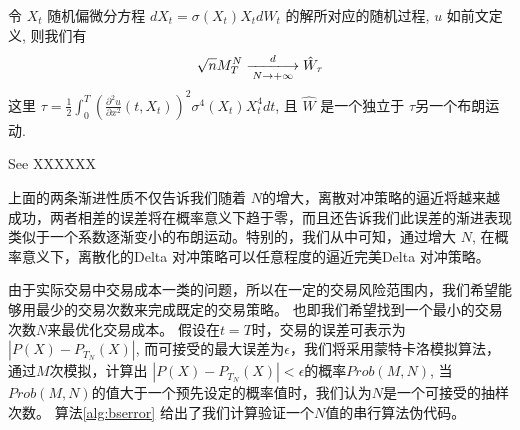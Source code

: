 令 $X_t$ 随机偏微分方程 $dX_t=\sigma(X_t)X_tdW_t$ 的解所对应的随机过程, $u$ 如前文定义, 则我们有 
\begin{equation}
\sqrt{n}M_T^N\xlongrightarrow[N\rightarrow +\infty]{d} \hat{W}_\tau
\end{equation}
这里 $\tau=\frac{1}{2}\int_0^T(\frac{\partial^2 u}{\partial x^2}(t,X_t))^2\sigma^4(X_t)X_t^4dt$, 且 $\hat{W}$ 是一个独立于 $\tau$另一个布朗运动.

See XXXXXX

上面的两条渐进性质不仅告诉我们随着 $N$的增大，离散对冲策略的逼近将越来越成功，两者相差的误差将在概率意义下趋于零，而且还告诉我们此误差的渐进表现
类似于一个系数逐渐变小的布朗运动。特别的，我们从中可知，通过增大 $N$, 在概率意义下，离散化的Delta 对冲策略可以任意程度的逼近完美Delta 对冲策略。

由于实际交易中交易成本一类的问题，所以在一定的交易风险范围内，我们希望能够用最少的交易次数来完成既定的交易策略。
也即我们希望找到一个最小的交易次数$N$来最优化交易成本。
假设在$t=T$时，交易的误差可表示为$|P(X) - P_{T_N}(X)|$, 而可接受的最大误差为$\epsilon$，我们将采用蒙特卡洛模拟算法，通过$M$次模拟，计算出
$|P(X) - P_{T_N}(X)| < \epsilon$的概率$Prob(M,N)$, 当$Prob(M,N)$的值大于一个预先设定的概率值时，我们认为$N$是一个可接受的抽样次数。
算法\ref{alg:bserror} 给出了我们计算验证一个$N$值的串行算法伪代码。


